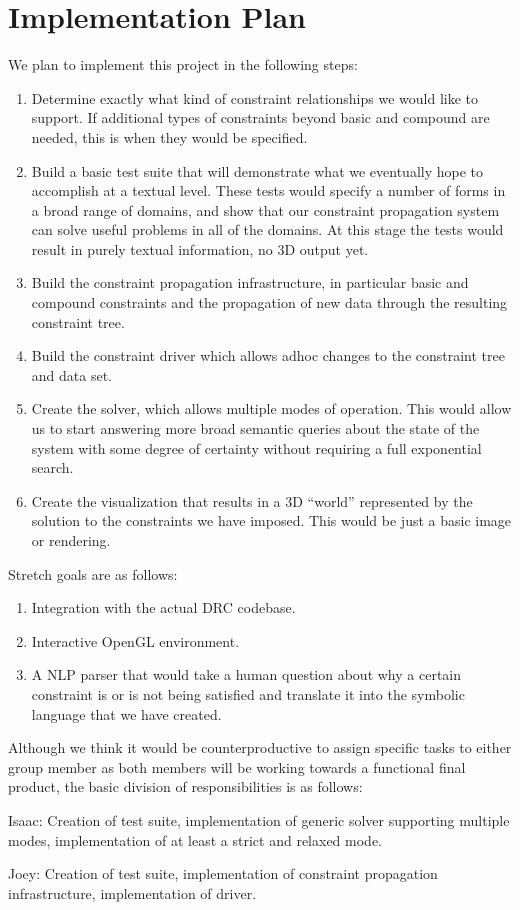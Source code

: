 \documentclass[a4paper,10pt]{article}
\begin{document}
\section{Implementation Plan}
We plan to implement this project in the following steps:
\begin{enumerate}
 \item Determine exactly what kind of constraint relationships we would like to 
support.  If additional types of constraints beyond basic and compound are 
needed, this is when they would be specified.
\item Build a basic test suite that will demonstrate what we eventually hope to 
accomplish at a textual level.  These tests would specify a number of forms in 
a broad range of domains, and show that our constraint propagation system can 
solve useful problems in all of the domains.  At this stage the tests would 
result in purely textual information, no 3D output yet.
\item Build the constraint propagation infrastructure, in particular basic and 
compound constraints and the propagation of new data through the resulting 
constraint tree.
\item Build the constraint driver which allows adhoc changes to the 
constraint tree and data set.
\item Create the solver, which allows multiple modes of operation.  This would 
allow us to start answering more broad semantic queries about the state of the 
system with some degree of certainty without requiring a full exponential 
search. 
\item Create the visualization that results in a 3D “world” represented by 
the solution to the constraints we have imposed.  This would be just a basic 
image or rendering.
\end{enumerate}

Stretch goals are as follows:
\begin{enumerate}
 \item Integration with the actual DRC codebase.
 \item Interactive OpenGL environment.
 \item A NLP parser that would take a human question about why a certain 
constraint is or is not being satisfied and translate it into the symbolic 
language that we have created.
 
\end{enumerate}

Although we think it would be counterproductive to assign specific tasks to 
either group member as both members will be working towards a functional final 
product, the basic division of responsibilities is as follows:

Isaac: Creation of test suite, implementation of generic solver supporting 
multiple modes, implementation of at least a strict and relaxed mode. 

Joey: Creation of test suite, implementation of constraint propagation 
infrastructure, implementation of driver.
\end{document}

